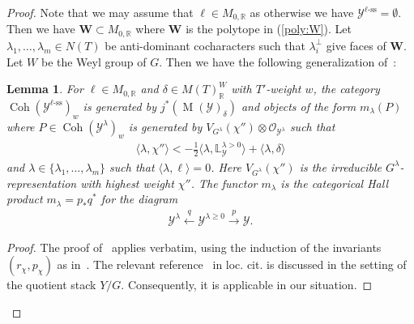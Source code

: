 \documentclass [11pt,oneside,a4paper,mathscr]{amsart}
\newtheorem{lemma}[thm]{Lemma}
\theoremstyle{definition}
\renewcommand{\geq}{\geqslant}
\newcommand{\Y}{\mathcal{Y}}
\newcommand{\MM}{\operatorname{M}}
\newcommand{\Coh}{\operatorname{Coh}}
\begin{document}
\begin{proof}
Note that we may assume that $\ell \in M_{0, \mathbb{R}}$ as otherwise we have $\Y^{\ell\text{-ss}}=\emptyset$.
Then we have $\mathbf{W} \subset M_{0, \mathbb{R}}$ where 
$\mathbf{W}$ is the polytope in (\ref{poly:W}). 
Let $\lambda_1, \ldots, \lambda_m\in N(T)$ be anti-dominant cocharacters 
such that $\lambda_i^{\perp}$ give faces of $\mathbf{W}$. 
Let $W$ be the Weyl group of $G$.
Then we have the following generalization of~\cite[Lemma~3.16]{PTquiver}: 
\begin{lemma}\label{lem:magicgen}
    For $\ell\in M_{0, \mathbb{R}}$ and $\delta \in M(T)_{\mathbb{R}}^W$ with 
    $T'$-weight $w$, the category $\Coh(\Y^{\ell\text{-ss}})_w$ is generated by 
    $j^*(\MM(\Y)_{\delta})$ and objects of the form $m_{\lambda}(P)$
    where $P \in \Coh(\Y^{\lambda})_w$ is generated by $V_{G^{\lambda}}(\chi'')\otimes \mathcal{O}_{\Y^{\lambda}}$ such that 
    \begin{align}\label{ineq:chi''}
        \langle \lambda, \chi'' \rangle <-\frac{1}{2}\langle \lambda, \mathbb{L}_{\Y}^{\lambda>0}\rangle+\langle \lambda, \delta\rangle
    \end{align}
    and $\lambda \in \{\lambda_1, \ldots, \lambda_m\}$ such that $\langle \lambda, \ell \rangle=0$. Here $V_{G^{\lambda}}(\chi'')$ is the irreducible $G^{\lambda}$-representation with highest weight $\chi''$. The functor $m_{\lambda}$ is 
    the categorical Hall product $m_{\lambda}=p_{*}q^{*}$ for the diagram 
    \begin{align*}
        \Y^{\lambda} \stackrel{q}{\leftarrow} \Y^{\lambda \geq 0} \stackrel{p}{\to} \Y.
    \end{align*}
\end{lemma}
\begin{proof}
    The proof of~\cite[Lemma~3.16]{PTquiver} applies verbatim, 
    using the induction of the invariants $(r_{\chi}, p_{\chi})$ as in~\cite{SvdB}. 
    The relevant reference~\cite[Proposition~3.4]{hls} in loc. cit. is discussed 
    in the setting of the quotient stack $Y/G$. Consequently, it is applicable in our situation. 
\end{proof}


\end{proof}
\end{document}
